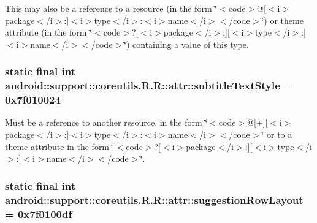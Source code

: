 This may also be a reference to a resource (in the form \char`\"{}$<$code$>$@\mbox{[}$<$i$>$package$<$/i$>$:\mbox{]}$<$i$>$type$<$/i$>$:$<$i$>$name$<$/i$>$$<$/code$>$\char`\"{}) or theme attribute (in the form \char`\"{}$<$code$>$?\mbox{[}$<$i$>$package$<$/i$>$:\mbox{]}\mbox{[}$<$i$>$type$<$/i$>$:\mbox{]}$<$i$>$name$<$/i$>$$<$/code$>$\char`\"{}) containing a value of this type. \hypertarget{classandroid_1_1support_1_1coreutils_1_1_r_1_1attr_53f4782656ff8506c8ad862b87753a16}{
\subsubsection[{subtitleTextStyle}]{\setlength{\rightskip}{0pt plus 5cm}static final int android::support::coreutils.R.R::attr::subtitleTextStyle = 0x7f010024}}
\label{classandroid_1_1support_1_1coreutils_1_1_r_1_1attr_53f4782656ff8506c8ad862b87753a16}


Must be a reference to another resource, in the form \char`\"{}$<$code$>$@\mbox{[}+\mbox{]}\mbox{[}$<$i$>$package$<$/i$>$:\mbox{]}$<$i$>$type$<$/i$>$:$<$i$>$name$<$/i$>$$<$/code$>$\char`\"{} or to a theme attribute in the form \char`\"{}$<$code$>$?\mbox{[}$<$i$>$package$<$/i$>$:\mbox{]}\mbox{[}$<$i$>$type$<$/i$>$:\mbox{]}$<$i$>$name$<$/i$>$$<$/code$>$\char`\"{}. \hypertarget{classandroid_1_1support_1_1coreutils_1_1_r_1_1attr_54ca8726abdd8d69fb2b261faf556d93}{
\subsubsection[{suggestionRowLayout}]{\setlength{\rightskip}{0pt plus 5cm}static final int android::support::coreutils.R.R::attr::suggestionRowLayout = 0x7f0100df}}
\label{classandroid_1_1support_1_1coreutils_1_1_r_1_1attr_54ca8726abdd8d69fb2b261faf556d93}


